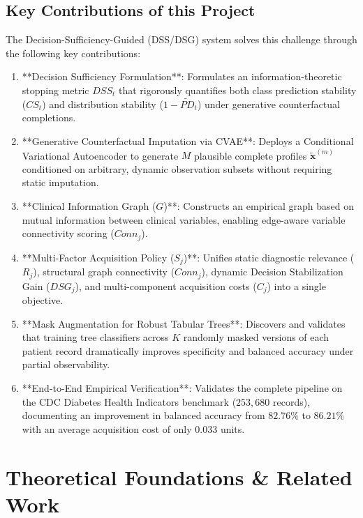 \documentclass[11pt,a4paper]{report}
\begin{document}
\section{Key Contributions of this Project}
The Decision-Sufficiency-Guided (DSS/DSG) system solves this challenge through the following key contributions:
\begin{enumerate}[label=\textbf{C\arabic*.},leftmargin=*]
  \item **Decision Sufficiency Formulation**: Formulates an information-theoretic stopping metric $DSS_t$ that rigorously quantifies both class prediction stability ($CS_t$) and distribution stability ($1 - \widetilde{PD}_t$) under generative counterfactual completions.
  \item **Generative Counterfactual Imputation via CVAE**: Deploys a Conditional Variational Autoencoder to generate $M$ plausible complete profiles $\tilde{\mathbf{x}}^{(m)}$ conditioned on arbitrary, dynamic observation subsets without requiring static imputation.
  \item **Clinical Information Graph ($G$)**: Constructs an empirical graph based on mutual information between clinical variables, enabling edge-aware variable connectivity scoring ($Conn_j$).
  \item **Multi-Factor Acquisition Policy ($S_j$)**: Unifies static diagnostic relevance ($R_j$), structural graph connectivity ($Conn_j$), dynamic Decision Stabilization Gain ($DSG_j$), and multi-component acquisition costs ($C_j$) into a single objective.
  \item **Mask Augmentation for Robust Tabular Trees**: Discovers and validates that training tree classifiers across $K$ randomly masked versions of each patient record dramatically improves specificity and balanced accuracy under partial observability.
  \item **End-to-End Empirical Verification**: Validates the complete pipeline on the CDC Diabetes Health Indicators benchmark ($253,680$ records), documenting an improvement in balanced accuracy from $82.76\%$ to $86.21\%$ with an average acquisition cost of only $0.033$ units.
\end{enumerate}

\chapter{Theoretical Foundations \& Related Work}
\end{document}
